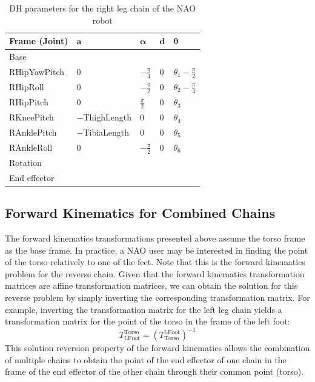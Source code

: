 \begin{table}[!t]
\centering
\caption{DH parameters for the right leg chain of the NAO robot}
\label{tab:DHrleg}
\begin{tabular}{|l|>{\centering\arraybackslash}m{2.55cm}|>{\centering\arraybackslash}m{2.55cm}|>{\centering\arraybackslash}m{2.55cm}|>{\centering\arraybackslash}m{2.55cm}|}
\hline
\textbf{Frame (Joint)} & $\mathbf{a}$ & $\boldsymbol{\alpha}$ & $\mathbf{d}$ & $\boldsymbol{\theta}$\\ \hline
Base & \multicolumn{4}{c|}{$A(0,\text{\footnotesize{$-$HipOffsetY}},\text{\footnotesize{$-$HipOffsetZ}})$} \\ \hline
RHipYawPitch & $0$ & $-\frac{\pi}{4}$ & $0$ & $\theta_1 - \frac{\pi}{2}$ \\ \hline
RHipRoll & $0$ & $-\frac{\pi}{2}$ & $0$ & $\theta_2 - \frac{\pi}{4}$ \\ \hline
RHipPitch & $0$ & $\frac{\pi}{2}$ & $0$ & $\theta_3$ \\ \hline
RKneePitch & \footnotesize{$-$ThighLength} & $0$ & $0$ & $\theta_4$ \\ \hline
RAnklePitch & \footnotesize{$-$TibiaLength} & $0$ & $0$ & $\theta_5$ \\ \hline
RAnkleRoll & $0$ & $-\frac{\pi}{2}$ & $0$ & $\theta_6$ \\ \hline
Rotation & \multicolumn{4}{c|}{$R_z(\pi)R_y(-\tfrac{\pi}{2})$} \\ \hline
End effector & \multicolumn{4}{c|}{$A(0,0,\text{\footnotesize{$-$FootHeight}})$} \\ \hline
\end{tabular}
\end{table}


\subsection{Forward Kinematics for Combined Chains}
The forward kinematics transformations presented above assume the torso frame as the base frame. In practice, a NAO user may be interested in finding the point of the torso relatively to one of the feet. Note that this is the forward kinematics problem for the reverse chain. Given that the forward kinematics transformation matrices are affine transformation matrices, we can obtain the solution for this reverse problem by simply inverting the corresponding transformation matrix. 
For example, inverting the transformation matrix for the left leg chain yields a transformation matrix for the point of the torso in the frame of the left foot: 
\[
T^\text{Torso}_\text{LFoot} = {\left(T^\text{LFoot}_\text{Torso}\right)}^{-1}
\]
This solution reversion property of the forward kinematics allows the combination of multiple chains to obtain the point of the end effector of one chain in the frame of the end effector of the other chain through their common point (torso). 

